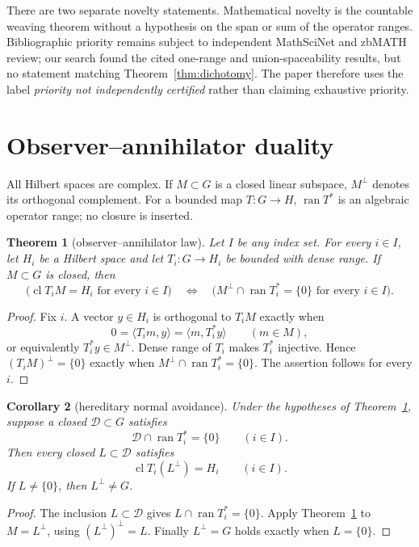 \documentclass[11pt]{article}
\newtheorem{theorem}{Theorem}[section]
\newtheorem{corollary}[theorem]{Corollary}
\newcommand{\ran}{\operatorname{ran}}
\newcommand{\clos}{\operatorname{cl}}
\newcommand{\cD}{\mathcal D}
\newcommand{\ip}[2]{\langle #1,#2\rangle}
\begin{document}
There are two separate novelty statements.  Mathematical novelty is the
countable weaving theorem without a hypothesis on the span or sum of the
operator ranges.  Bibliographic priority remains subject to independent
MathSciNet and zbMATH review; our search found the cited one-range and
union-spaceability results, but no statement matching
Theorem~\ref{thm:dichotomy}.  The paper therefore uses the label
\emph{priority not independently certified} rather than claiming exhaustive
priority.

\section{Observer--annihilator duality}\label{sec:duality}

All Hilbert spaces are complex.  If \(M\subset G\) is a closed linear
subspace, \(M^\perp\) denotes its orthogonal complement.  For a bounded map
\(T:G\to H\), \(\ran T^*\) is an algebraic operator range; no closure is
inserted.

\begin{theorem}[observer--annihilator law]\label{thm:observer}
Let \(I\) be any index set.  For every \(i\in I\), let \(H_i\) be a Hilbert
space and let \(T_i:G\to H_i\) be bounded with dense range.  If \(M\subset G\)
is closed, then
\[
  \bigl(\clos{T_iM}=H_i\text{ for every }i\in I\bigr)
  \quad\Longleftrightarrow\quad
  \bigl(M^\perp\cap\ran T_i^*=\{0\}\text{ for every }i\in I\bigr).
  \tag{2.1}
\]
\end{theorem}

\begin{proof}
Fix \(i\).  A vector \(y\in H_i\) is orthogonal to \(T_iM\) exactly when
\[
  0=\ip{T_im}{y}=\ip{m}{T_i^*y}\qquad(m\in M),
\]
or equivalently \(T_i^*y\in M^\perp\).  Dense range of \(T_i\) makes
\(T_i^*\) injective.  Hence \((T_iM)^\perp=\{0\}\) exactly when
\(M^\perp\cap\ran T_i^*=\{0\}\).  The assertion follows for every \(i\).
\end{proof}

\begin{corollary}[hereditary normal avoidance]\label{cor:hereditary}
Under the hypotheses of Theorem~\ref{thm:observer}, suppose a closed
\(\cD\subset G\) satisfies
\[
  \cD\cap\ran T_i^*=\{0\}\qquad(i\in I).
  \tag{2.2}
\]
Then every closed \(L\subset\cD\) satisfies
\[
  \clos{T_i(L^\perp)}=H_i\qquad(i\in I).
  \tag{2.3}
\]
If \(L\ne\{0\}\), then \(L^\perp\ne G\).
\end{corollary}

\begin{proof}
The inclusion \(L\subset\cD\) gives
\(L\cap\ran T_i^*=\{0\}\).  Apply
Theorem~\ref{thm:observer} to \(M=L^\perp\), using
\((L^\perp)^\perp=L\).  Finally \(L^\perp=G\) holds exactly when
\(L=\{0\}\).
\end{proof}
\end{document}
